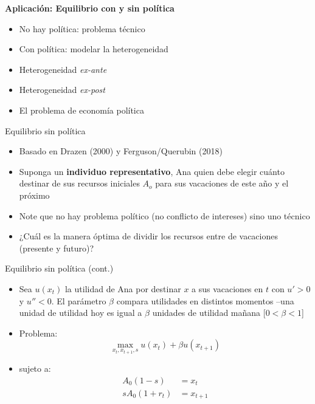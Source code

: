 \documentclass[
  ignorenonframetext,
]{beamer}
\providecommand{\tightlist}{%
  \setlength{\itemsep}{0pt}\setlength{\parskip}{0pt}}\usepackage{longtable,booktabs,array}
\begin{document}
\begin{frame}{\textbf{Aplicación: Equilibrio con y sin política}}
\protect\hypertarget{aplicaciuxf3n-equilibrio-con-y-sin-poluxedtica}{}
\begin{itemize}
\tightlist
\item
  No hay política: problema técnico
\item
  Con política: modelar la heterogeneidad
\item
  Heterogeneidad \emph{ex-ante}
\item
  Heterogeneidad \emph{ex-post}
\item
  El problema de economía política
\end{itemize}

\begin{block}{Equilibrio sin política}
\protect\hypertarget{equilibrio-sin-poluxedtica}{}
\begin{itemize}
\tightlist
\item
  Basado en Drazen (2000) y Ferguson/Querubin (2018)
\item
  Suponga un \textbf{individuo representativo}, Ana quien debe elegir
  cuánto destinar de sus recursos iniciales \(A_{o}\) para sus
  vacaciones de este año y el próximo
\item
  Note que no hay problema político (no conflicto de intereses) sino uno
  técnico
\item
  ¿Cuál es la manera óptima de dividir los recursos entre de vacaciones
  (presente y futuro)?
\end{itemize}
\end{block}

\begin{block}{Equilibrio sin política (cont.)}
\protect\hypertarget{equilibrio-sin-poluxedtica-cont.}{}
\begin{itemize}
\tightlist
\item
  Sea \(u(x_{t})\) la utilidad de Ana por destinar \(x\) a sus
  vacaciones en \(t\) con \(u'>0\) y \(u''<0\). El parámetro \(\beta\)
  compara utilidades en distintos momentos --una unidad de utilidad hoy
  es igual a \(\beta\) unidades de utilidad mañana {[}\(0<\beta<1\){]}
\item
  Problema: \[\max_{x_{t},x_{t+1},s} u(x_{t})+\beta u(x_{t+1})\]
\item
  sujeto a: \[\begin{aligned}
        A_{0}(1-s)&=x_{t} \\
       sA_{0}(1+r_{t})&=x_{t+1} 
        \end{aligned}\]
\end{itemize}
\end{block}


\end{frame}
\end{document}
